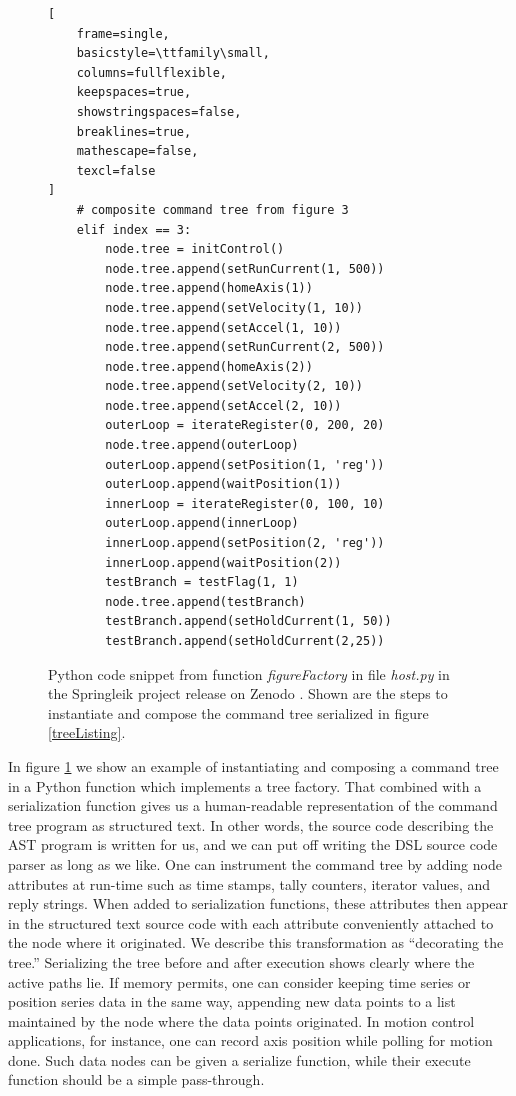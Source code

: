 \documentclass[a4paper,10pt]{article}
\begin{document}
\begin{figure}[t]
\centering
\begin{minipage}{0.9\linewidth}
\begin{lstlisting}[
    frame=single,
    basicstyle=\ttfamily\small,
    columns=fullflexible,
    keepspaces=true,
    showstringspaces=false,
    breaklines=true,
    mathescape=false,
    texcl=false
]
    # composite command tree from figure 3
    elif index == 3:
        node.tree = initControl()
        node.tree.append(setRunCurrent(1, 500))
        node.tree.append(homeAxis(1))
        node.tree.append(setVelocity(1, 10))
        node.tree.append(setAccel(1, 10))
        node.tree.append(setRunCurrent(2, 500))
        node.tree.append(homeAxis(2))
        node.tree.append(setVelocity(2, 10))
        node.tree.append(setAccel(2, 10))
        outerLoop = iterateRegister(0, 200, 20)
        node.tree.append(outerLoop)
        outerLoop.append(setPosition(1, 'reg'))
        outerLoop.append(waitPosition(1))
        innerLoop = iterateRegister(0, 100, 10)
        outerLoop.append(innerLoop)
        innerLoop.append(setPosition(2, 'reg'))
        innerLoop.append(waitPosition(2))
        testBranch = testFlag(1, 1)
        node.tree.append(testBranch)
        testBranch.append(setHoldCurrent(1, 50))
        testBranch.append(setHoldCurrent(2,25))
\end{lstlisting}
\end{minipage}
\caption{Python code snippet from function \textit{figureFactory} in file \textit{host.py} in the Springleik project release on Zenodo
\protect\cite{ZenodoPython}. Shown are the steps to instantiate and compose the command tree serialized in figure \protect\ref{treeListing}.}
\label{figureFactory}
\end{figure}

In figure \ref{figureFactory} we show an example of instantiating and composing a command tree in a Python function which implements a tree factory. That combined with a serialization function gives us a human-readable representation of the command tree program as structured text. In other words, the source code describing the AST program is written for us, and we can put off writing the DSL source code parser as long as we like. One can instrument the command tree by adding node attributes at run-time such as time stamps, tally counters, iterator values, and reply strings. When added to serialization functions, these attributes then appear in the structured text source code with each attribute conveniently attached to the node where it originated. We describe this transformation as ``decorating the tree.'' Serializing the tree before and after execution shows clearly where the active paths lie. If memory permits, one can consider keeping time series or position series data in the same way, appending new data points to a list maintained by the node where the data points originated. In motion control applications, for instance, one can record axis position while polling for motion done. Such data nodes can be given a serialize function, while their execute function should be a simple pass-through.
\end{document}
